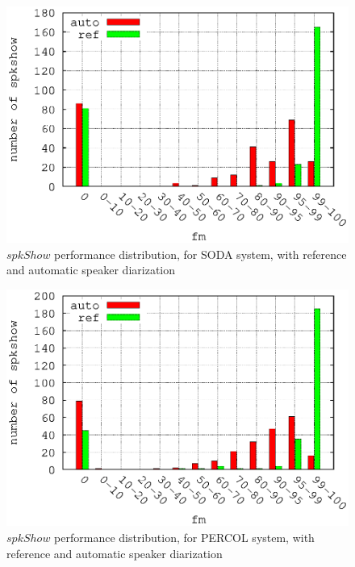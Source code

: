 \begin{figure}[!h]
\includegraphics[scale=0.6]{SODA.eps}
\caption{$spkShow$ performance distribution, for SODA system, with reference and automatic speaker diarization}
\label{soda-autoref}
\end{figure}

\begin{figure}[!h]
\includegraphics[scale=0.6]{PERCOL.eps}
\caption{$spkShow$ performance distribution, for PERCOL system, with reference and automatic speaker diarization}
\label{percol-autoref}
\end{figure}


